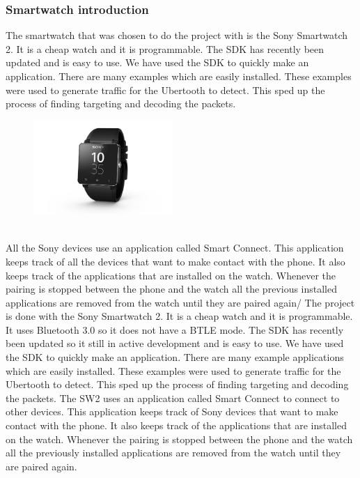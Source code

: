 \subsubsection{Smartwatch introduction}
\label{subsec:sw2}
The smartwatch that was chosen to do the project with is the Sony 
Smartwatch 2. It is a cheap watch and it is programmable. The SDK has recently been updated and is easy to use. We have used the SDK to quickly make an application. There are many examples which are easily installed. These examples were used to generate traffic for the Ubertooth to detect. This sped up the process of finding targeting and decoding the packets. 
\begin{figure}[!h]
  \begin{center}
	\includegraphics[width=200px]{images/sw2.jpg}
	\label{Sony Smartwatch 2}
  \end{center}
\end{figure}
\\
All the Sony devices use an application called Smart Connect. This application keeps track of all the devices that want to make contact with the phone. It also keeps track of the applications that are installed on the watch. Whenever the pairing is stopped between the phone and the watch all the previous installed applications are removed from the watch until they are paired again/
The project is done with the Sony Smartwatch 2. It is a cheap watch and it is programmable. It uses Bluetooth 3.0 so it does not have a BTLE mode. The SDK has recently been updated so it still in active development and is easy to use. We have used the SDK to quickly make an application. There are many example applications which are easily installed. These examples were used to generate traffic for the Ubertooth to detect. This sped up the process of finding targeting and decoding the packets. \pend
The SW2 uses an application called Smart Connect to connect to other devices. This application keeps track of Sony devices that want to make contact with the phone. It also keeps track of the applications that are installed on the watch. Whenever the pairing is stopped between the phone and the watch all the previously installed applications are removed from the watch until they are paired again.
